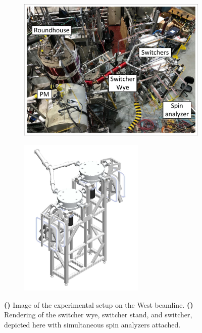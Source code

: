 \begin{figure}
\centering
\begin{subfigure}{.5\textwidth}
  \centering
  \includegraphics[width=\textwidth]{figures/2021_west_beamline_image.pdf}
  \vspace{5pt}
  \caption{}\label{subfig:west_beamline_switchers}
\end{subfigure}%
\begin{subfigure}{.5\textwidth}
  \centering
  \includegraphics[height=3in]{figures/switcher_mockup.png}
  \caption{}\label{subfig:switcher_mockup}
\end{subfigure}
\caption
{\textbf{()} Image of the experimental setup on the West beamline. \textbf{()} Rendering of the switcher wye, switcher stand, and switcher, depicted here with simultaneous spin analyzers attached.}
\label{fig:west_beamline_switchers}
\end{figure}



